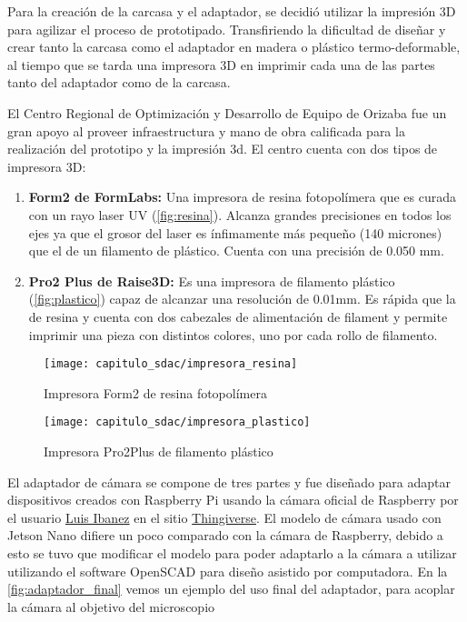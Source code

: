 Para la creación de la carcasa y el adaptador, se decidió utilizar la impresión
3D para agilizar el proceso de prototipado. Transfiriendo la dificultad de
diseñar y crear tanto la carcasa como el adaptador en madera o plástico
termo-deformable, al tiempo que se tarda una impresora 3D en imprimir cada una
de las partes tanto del adaptador como de la carcasa.

El Centro Regional de Optimización y Desarrollo de Equipo de Orizaba fue un gran
apoyo al proveer infraestructura y mano de obra calificada para la realización
del prototipo y la impresión 3d. El centro cuenta con dos tipos de impresora 3D:

\begin{enumerate}
    \item{\textbf{Form2 de FormLabs: }}  Una impresora de resina fotopolímera
    que es curada con un rayo laser UV (\autoref{fig:resina}). Alcanza grandes
    precisiones en todos los ejes ya que el grosor del laser es ínfimamente más
    pequeño (140 micrones) que el de un filamento de plástico. Cuenta con una
    precisión de 0.050 mm.
    \item{\textbf{Pro2 Plus de Raise3D: }} Es una impresora de filamento
    plástico (\autoref{fig:plastico}) capaz de alcanzar una resolución de
    0.01mm. Es rápida que la de resina y cuenta con dos cabezales de
    alimentación de filament y permite imprimir una pieza con distintos colores,
    uno por cada rollo de filamento. 
\end{enumerate}

\begin{figure}[H]
    \centering
    \texttt{[image: capitulo\_sdac/impresora\_resina]}
    \caption{Impresora Form2 de resina fotopolímera}\label{fig:resina}
\end{figure}

\begin{figure}[H]
    \centering
    \texttt{[image: capitulo\_sdac/impresora\_plastico]}
    \caption{Impresora Pro2Plus de filamento plástico}\label{fig:plastico}
\end{figure}

El adaptador de cámara se compone de tres partes y fue diseñado para adaptar
dispositivos creados con Raspberry Pi usando la cámara oficial de Raspberry por
el usuario \hyperlink{https://www.thingiverse.com/luisibanez/about}{Luis Ibanez}
en el sitio \hyperlink{https://www.thingiverse.com/}{Thingiverse}. El modelo de
cámara usado con Jetson Nano difiere un poco comparado con la cámara de
Raspberry, debido a esto se tuvo que modificar el modelo para poder adaptarlo a
la cámara a utilizar utilizando el software OpenSCAD para diseño asistido por
computadora. En la \autoref{fig:adaptador_final} vemos un ejemplo del uso final
del adaptador, para acoplar la cámara al objetivo del microscopio

